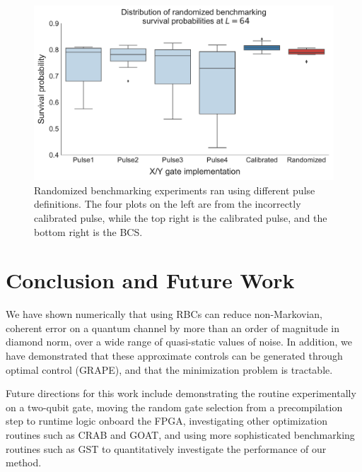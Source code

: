 \documentclass[aps,nofootinbib,pra,notitlepage,twocolumn]{revtex4-1}
\begin{document}
\begin{figure}
  \centering
  \includegraphics[width=\columnwidth]{rb_data.pdf}
  \caption{Randomized benchmarking experiments ran using different pulse definitions. The four plots on the left are from the incorrectly calibrated pulse, while the top right is the calibrated pulse, and the bottom right is the BCS.}
  \label{fig:rb}
\end{figure}

\section{Conclusion and Future Work}
We have shown numerically that using RBCs can reduce non-Markovian, coherent error on a quantum channel by more than an order of magnitude in diamond norm, over a wide range of quasi-static values of noise. In addition, we have demonstrated that these approximate controls can be generated through optimal control (GRAPE), and that the minimization problem is tractable. 


Future directions for this work include demonstrating the routine experimentally on a two-qubit gate, moving the random gate selection from a precompilation step to runtime logic onboard the FPGA, investigating other optimization routines such as CRAB \cite{Caneva2011} and GOAT\cite{Machnes2018}, and using more sophisticated benchmarking routines such as GST\cite{BlumeKohout2017} to quantitatively investigate the performance of our method. 
\end{document}

